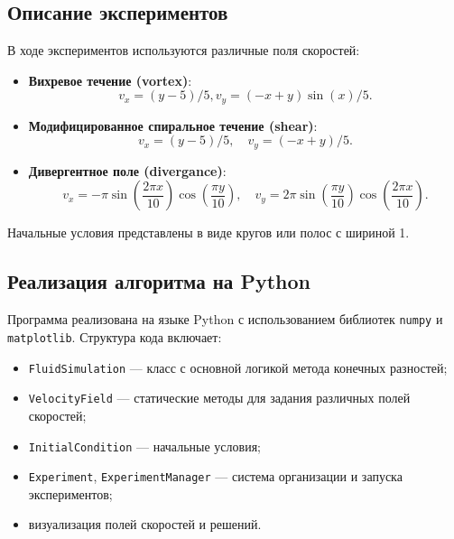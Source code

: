 \subsection{Описание экспериментов}

В ходе экспериментов используются различные поля скоростей:
\begin{itemize}
	\item \textbf{Вихревое течение (vortex)}:
	\begin{equation}
        v_x = (y-5) / 5,
		v_y = (-x + y) \sin(x )/5.
			\label{eq:vortex}
	\end{equation}

	
	\item \textbf{Модифицированное спиральное течение (shear)}:
	\begin{equation}
		v_x = (y - 5) / 5, \quad
		v_y = (-x + y) / 5.
			\label{eq:shear}
	\end{equation}

	
	\item \textbf{Дивергентное поле (divergance)}:
	\begin{equation}
			v_x = -\pi \sin\left( \frac{2\pi x}{10} \right) \cos\left( \frac{\pi y}{10} \right), \quad
		v_y = 2\pi \sin\left( \frac{\pi y}{10} \right) \cos\left( \frac{2\pi x}{10} \right).
		\label{eq:div}
	\end{equation}

\end{itemize}

Начальные условия представлены в виде кругов или полос с шириной 1.

\subsection{Реализация алгоритма на Python}

Программа реализована на языке Python с использованием библиотек \texttt{numpy} и \texttt{matplotlib}. Структура кода включает:
\begin{itemize}
	\item \texttt{FluidSimulation} — класс с основной логикой метода конечных разностей;
	\item \texttt{VelocityField} — статические методы для задания различных полей скоростей;
	\item \texttt{InitialCondition} — начальные условия;
	\item \texttt{Experiment}, \texttt{ExperimentManager} — система организации и запуска экспериментов;
	\item визуализация полей скоростей и решений.
\end{itemize}


